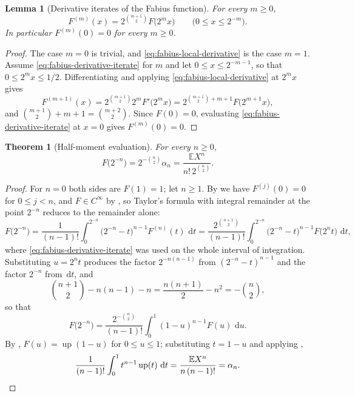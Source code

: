 \documentclass[11pt,oneside,openany]{book}
\newtheorem{theorem}{Theorem}[chapter]
\newtheorem{lemma}[lemma]{Lemma}
\theoremstyle{definition}
\theoremstyle{remark}
\newcommand{\dd}{\,\mathrm d}
\begin{document}
\begin{lemma}[Derivative iterates of the Fabius function]\label{lem:fabius-derivative-iterate}
For every $m\ge0$,
\begin{equation}\label{eq:fabius-derivative-iterate}
 F^{(m)}(x)=2^{\binom{m+1}{2}}F\bigl(2^mx\bigr)
 \qquad\bigl(0\le x\le2^{-m}\bigr).
\end{equation}
In particular $F^{(m)}(0)=0$ for every $m\ge0$.
\end{lemma}

\begin{proof}
The case $m=0$ is trivial, and \eqref{eq:fabius-local-derivative} is the case $m=1$.
Assume \eqref{eq:fabius-derivative-iterate} for $m$ and let $0\le x\le2^{-m-1}$, so that
$0\le2^mx\le1/2$.  Differentiating and applying \eqref{eq:fabius-local-derivative} at
$2^mx$ gives
\[
 F^{(m+1)}(x)=2^{\binom{m+1}{2}}2^mF'\bigl(2^mx\bigr)
 =2^{\binom{m+1}{2}+m+1}F\bigl(2^{m+1}x\bigr),
\]
and $\binom{m+1}{2}+m+1=\binom{m+2}{2}$.  Since $F(0)=0$, evaluating
\eqref{eq:fabius-derivative-iterate} at $x=0$ gives $F^{(m)}(0)=0$.
\end{proof}

\begin{theorem}[Half-moment evaluation]\label{thm:fabius-half-moment}
For every $n\ge0$,
\begin{equation}\label{eq:fabius-half-moment}
 F\bigl(2^{-n}\bigr)=2^{-\binom n2}\alpha_n
 =\frac{\mathbb EX^n}{n!\,2^{\binom n2}} .
\end{equation}
\end{theorem}

\begin{proof}
For $n=0$ both sides are $F(1)=1$; let $n\ge1$.  By
 we have $F^{(j)}(0)=0$ for $0\le j<n$, and
$F\in C^\infty$ by , so Taylor's formula with integral
remainder at the point $2^{-n}$ reduces to the remainder alone:
\[
 F\bigl(2^{-n}\bigr)
 =\frac1{(n-1)!}\int_0^{2^{-n}}\bigl(2^{-n}-t\bigr)^{n-1}F^{(n)}(t)\,\dd t
 =\frac{2^{\binom{n+1}{2}}}{(n-1)!}
   \int_0^{2^{-n}}\bigl(2^{-n}-t\bigr)^{n-1}F\bigl(2^nt\bigr)\,\dd t,
\]
where \eqref{eq:fabius-derivative-iterate} was used on the whole interval of integration.
Substituting $u=2^nt$ produces the factor $2^{-n(n-1)}$ from $(2^{-n}-t)^{n-1}$ and the
factor $2^{-n}$ from $\dd t$, and
\[
 \binom{n+1}{2}-n(n-1)-n=\frac{n(n+1)}2-n^2=-\binom n2 ,
\]
so that
\[
 F\bigl(2^{-n}\bigr)=\frac{2^{-\binom n2}}{(n-1)!}\int_0^1(1-u)^{n-1}F(u)\,\dd u .
\]
By , $F(u)=\operatorname{up}(1-u)$ for $0\le u\le1$; substituting
$t=1-u$ and applying ,
\[
 \frac1{(n-1)!}\int_0^1t^{n-1}\operatorname{up}(t)\,\dd t
 =\frac{\mathbb EX^n}{n\,(n-1)!}
 =\alpha_n. \qedhere
\]
\end{proof}
\end{document}

